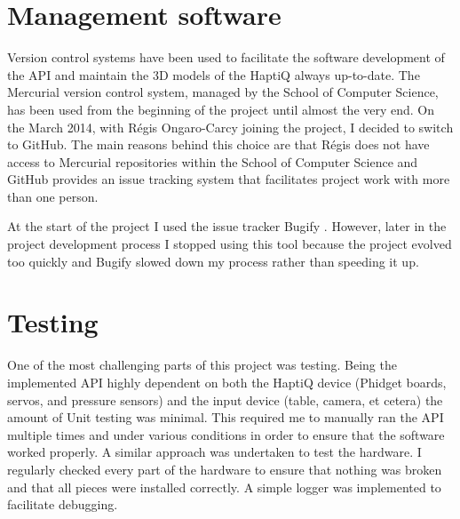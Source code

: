 \section{Management software}
Version control systems have been used to facilitate the software development of the API and maintain the 3D models of the HaptiQ always up-to-date. The Mercurial version control system, managed by the School of Computer Science, has been used from the beginning of the project until almost the very end. On the  March 2014, with Régis Ongaro-Carcy joining the project, I decided to switch to GitHub. The main reasons behind this choice are that Régis does not have access to Mercurial repositories within the School of Computer Science and GitHub provides an issue tracking system that facilitates project work with more than one person.  

At the start of the project I used the issue tracker Bugify \cite{bugify}. However, later in the project development process I stopped using this tool because the project evolved too quickly and Bugify slowed down my process rather than speeding it up. 

\section{Testing}
One of the most challenging parts of this project was testing. Being the implemented API highly dependent on both the HaptiQ device (Phidget boards, servos, and pressure sensors) and the input device (table, camera, et cetera) the amount of Unit testing was minimal. This required me to manually ran the API multiple times and under various conditions in order to ensure that the software worked properly. A similar approach was undertaken to test the hardware. I regularly checked every part of the hardware to ensure that nothing was broken and that all pieces were installed correctly.
A simple logger was implemented to facilitate debugging.